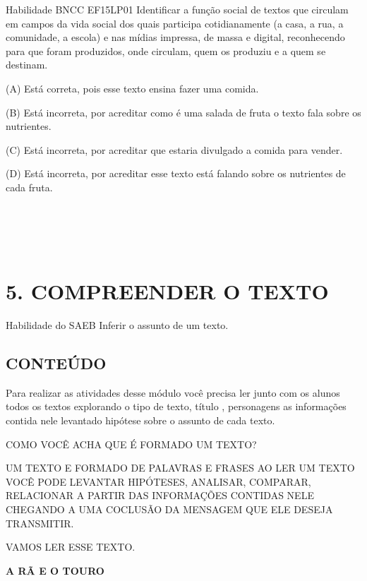 Habilidade BNCC EF15LP01 Identificar a função social de textos que
circulam em campos da vida social dos quais participa cotidianamente (a
casa, a rua, a comunidade, a escola) e nas mídias impressa, de massa e
digital, reconhecendo para que foram produzidos, onde circulam, quem os
produziu e a quem se destinam.

\protect\hypertarget{_heading=h.2xcytpi}{}{}(A) Está correta, pois esse
texto ensina fazer uma comida.

(B) Está incorreta, por acreditar como é uma salada de fruta o texto
fala sobre os nutrientes.

(C) Está incorreta, por acreditar que estaria divulgado a comida para
vender.

(D) Está incorreta, por acreditar esse texto está falando sobre os
nutrientes de cada fruta.

\section{\texorpdfstring{\\
}{ }}\label{section-15}

\section{5. COMPREENDER O
TEXTO}\label{muxf3dulo-5-compreender-o-texto}

\protect\hypertarget{_heading=h.3whwml4}{}{}Habilidade do SAEB
Inferir o assunto de um texto.

\subsection{CONTEÚDO}\label{conteuxfado-4}

Para realizar as atividades desse módulo você precisa ler junto com os
alunos todos os textos explorando o tipo de texto, título , personagens
as informações contida nele levantado hipótese sobre o assunto de cada
texto.

COMO VOCÊ ACHA QUE É FORMADO UM TEXTO?

UM TEXTO E FORMADO DE PALAVRAS E FRASES AO LER UM TEXTO VOCÊ PODE
LEVANTAR HIPÓTESES, ANALISAR, COMPARAR, RELACIONAR A PARTIR DAS
INFORMAÇÕES CONTIDAS NELE CHEGANDO A UMA COCLUSÃO DA MENSAGEM QUE ELE
DESEJA TRANSMITIR.

VAMOS LER ESSE TEXTO.

\textbf{A RÃ E O TOURO}

